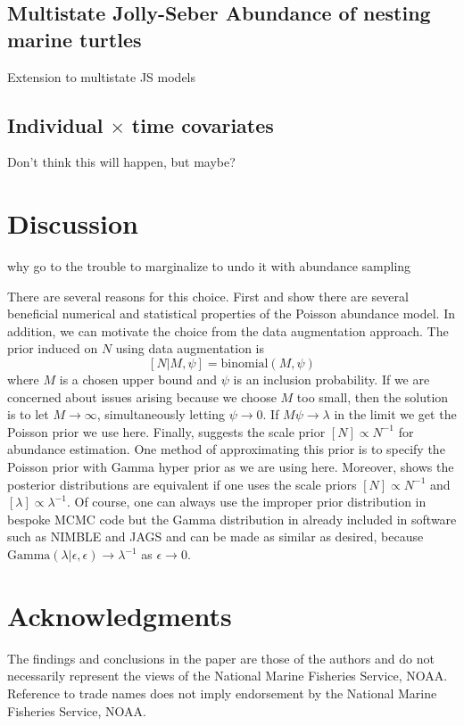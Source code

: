 \documentclass[12pt]{article}
\begin{document}
\subsection{Multistate Jolly-Seber Abundance of nesting marine turtles}

Extension to multistate JS models

\subsection{Individual $\times$ time covariates}

Don't think this will happen, but maybe?

\section{Discussion}

why go to the trouble to marginalize to undo it with abundance sampling

There are several reasons for this choice. First \cite{schofield201650} and \cite{schofield2023estimating} show there are several beneficial numerical and statistical properties of the Poisson abundance model. In addition, we can motivate the choice from the data augmentation approach. The prior induced on $N$ using data augmentation is  
\[
[N|M, \psi] = \text{binomial}(M,\psi)
\]
where $M$ is a chosen upper bound and $\psi$ is an inclusion probability. If we are concerned about issues arising because we choose $M$ too small, then the solution is to let $M\to\infty$, simultaneously letting $\psi \to 0$. If $M\psi \to \lambda$ in the limit we get the Poisson prior we use here. Finally, \cite{link2013cautionary} suggests the scale prior $[N] \propto N^{-1}$ for abundance estimation. One method of approximating this prior is to specify the Poisson prior with Gamma hyper prior as we are using here. Moreover, \cite{schofield2023estimating} shows the posterior distributions are equivalent if one uses the scale priors $[N] \propto N^{-1}$ and $[\lambda] \propto \lambda^{-1}$. Of course, one can always use the improper prior distribution in bespoke MCMC code but the Gamma distribution in already included in software such as NIMBLE and JAGS and can be made as similar as desired, because $\text{Gamma}(\lambda|\epsilon,\epsilon) \to \lambda^{-1}$ as $\epsilon \to 0$. 




\section*{Acknowledgments}
The findings and conclusions in the paper are those of the authors and do not necessarily represent the views of the National Marine Fisheries Service, NOAA. Reference to trade names does not imply endorsement by the National Marine Fisheries Service, NOAA.
\end{document}
